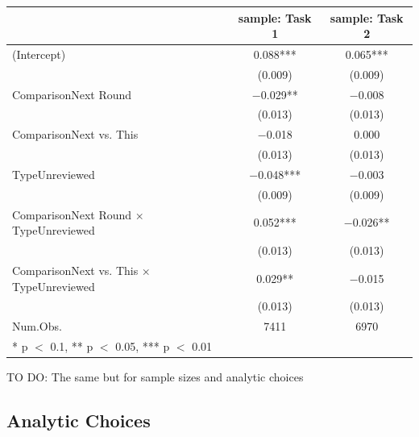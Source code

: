\documentclass[
  letterpaper,
  DIV=11,
  numbers=noendperiod]{scrartcl}
\begin{document}
\begin{table}
\centering
\begin{tabular}[t]{lcc}
\toprule
  & sample: Task 1 & sample: Task 2\\
\midrule
(Intercept) & \num{0.088}*** & \num{0.065}***\\
 & (\num{0.009}) & \vphantom{1} (\num{0.009})\\
ComparisonNext Round & \num{-0.029}** & \num{-0.008}\\
 & (\num{0.013}) & \vphantom{3} (\num{0.013})\\
ComparisonNext vs. This & \num{-0.018} & \num{0.000}\\
 & (\num{0.013}) & \vphantom{2} (\num{0.013})\\
TypeUnreviewed & \num{-0.048}*** & \num{-0.003}\\
 & (\num{0.009}) & (\num{0.009})\\
ComparisonNext Round × TypeUnreviewed & \num{0.052}*** & \num{-0.026}**\\
 & (\num{0.013}) & \vphantom{1} (\num{0.013})\\
ComparisonNext vs. This × TypeUnreviewed & \num{0.029}** & \num{-0.015}\\
 & (\num{0.013}) & (\num{0.013})\\
\midrule
Num.Obs. & \num{7411} & \num{6970}\\
\bottomrule
\multicolumn{3}{l}{\rule{0pt}{1em}* p $<$ 0.1, ** p $<$ 0.05, *** p $<$ 0.01}\\
\end{tabular}
\end{table}

TO DO: The same but for sample sizes and analytic choices

\hypertarget{analytic-choices}{%
\subsection{Analytic Choices}\label{analytic-choices}}
\end{document}
